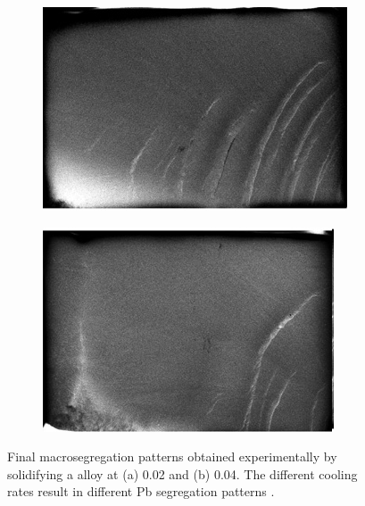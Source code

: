 %
\begin{figure}[htbp]
\centering
  \begin{subfigure}[t]{0.45\textwidth}
    \centering
	\includegraphics[width=\textwidth]{Chapter5/Graphics/2d/Hachani0p02.png}
	\caption{}
    \label{fig:smacs_lowcr}
  \end{subfigure}
  \hfill
  \begin{subfigure}[t]{0.45\textwidth}
    \centering
	\includegraphics[width=\textwidth]{Chapter5/Graphics/2d/Hachani0p04.png}
	\caption{}
    \label{fig:smacs_highcr}
  \end{subfigure}
\caption{Final macrosegregation patterns obtained experimentally by solidifying a  alloy at (a) \SI{0.02}{\uCR} and (b) \SI{0.04}{\uCR}. 
The different cooling rates result in different Pb segregation patterns \citep{hachani_experimental_2012}.}
\label{fig:smacs_exp}
\end{figure}


